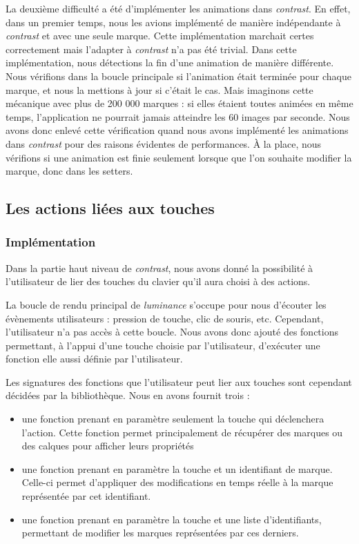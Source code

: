 \documentclass[12pt]{article}
\begin{document}
La deuxième difficulté a été d'implémenter les animations dans \textit{contrast}.
En effet, dans un premier temps, nous les avions implémenté de manière indépendante à \textit{contrast} et avec une seule marque. Cette implémentation marchait certes correctement mais l'adapter à \textit{contrast} n'a pas été trivial.
Dans cette implémentation, nous détections la fin d'une animation de manière différente. Nous vérifions
dans la boucle principale si l'animation était terminée pour chaque marque, et nous la mettions à jour si
c'était le cas.
Mais imaginons cette mécanique avec plus de 200 000 marques : si elles étaient toutes animées en même
temps, l'application ne pourrait jamais atteindre les 60 images par seconde.
Nous avons donc enlevé cette vérification quand nous avons implémenté les animations dans \textit{contrast}
pour des raisons évidentes de performances.
À la place, nous vérifions si une animation est finie seulement lorsque que l'on souhaite modifier la
marque, donc dans les setters.

\subsection{Les actions liées aux touches}

\subsubsection{Implémentation}

Dans la partie haut niveau de \textit{contrast}, nous avons donné la possibilité à
l’utilisateur de lier des touches du clavier qu’il aura choisi à des actions.

La boucle de rendu principal de \textit{luminance} s'occupe pour nous d'écouter les
évènements utilisateurs : pression de touche, clic de souris, etc.
Cependant, l'utilisateur n'a pas accès à cette boucle. Nous avons donc ajouté des
fonctions permettant, à l'appui d'une touche choisie par l'utilisateur, d'exécuter une
fonction elle aussi définie par l'utilisateur.

Les signatures des fonctions que l'utilisateur peut lier aux touches sont cependant
décidées par la bibliothèque. Nous en avons fournit trois :
\begin{itemize}
\item une fonction prenant en paramètre seulement la touche qui déclenchera l'action.
Cette fonction permet principalement de récupérer des marques ou des calques pour
afficher leurs propriétés
\item une fonction prenant en paramètre la touche et un identifiant de marque. Celle-ci
permet d'appliquer des modifications en temps réelle à la marque représentée par cet
identifiant.
\item une fonction prenant en paramètre la touche et une liste d'identifiants, permettant de modifier les marques représentées par ces derniers.
\end{itemize}
\end{document}
